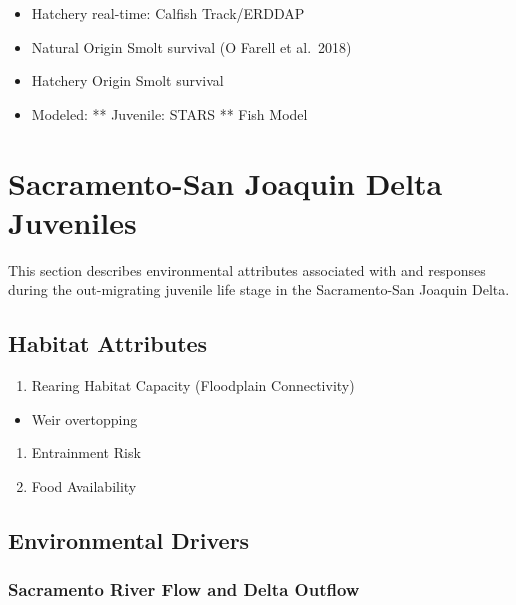 \documentclass[
]{book}
\providecommand{\tightlist}{%
  \setlength{\itemsep}{0pt}\setlength{\parskip}{0pt}}
\theoremstyle{definition}
\theoremstyle{definition}
\theoremstyle{definition}
\theoremstyle{definition}
\theoremstyle{remark}
\begin{document}
\begin{itemize}
\tightlist
\item
  Hatchery real-time: Calfish Track/ERDDAP
\item
  Natural Origin Smolt survival (O Farell et al.~2018)
\item
  Hatchery Origin Smolt survival
\item
  Modeled: ** Juvenile: STARS ** Fish Model
\end{itemize}

\hypertarget{sacramento-san-joaquin-delta-juveniles}{%
\chapter{Sacramento-San Joaquin Delta Juveniles}\label{sacramento-san-joaquin-delta-juveniles}}

This section describes environmental attributes associated with and responses during the out-migrating juvenile life stage in the Sacramento-San Joaquin Delta.

\hypertarget{habitat-attributes-4}{%
\section{Habitat Attributes}\label{habitat-attributes-4}}

\begin{enumerate}
\def\labelenumi{\arabic{enumi}.}
\tightlist
\item
  Rearing Habitat Capacity (Floodplain Connectivity)
\end{enumerate}

\begin{itemize}
\tightlist
\item
  Weir overtopping
\end{itemize}

\begin{enumerate}
\def\labelenumi{\arabic{enumi}.}
\setcounter{enumi}{1}
\item
  Entrainment Risk
\item
  Food Availability
\end{enumerate}

\hypertarget{environmental-drivers-3}{%
\section{Environmental Drivers}\label{environmental-drivers-3}}

\hypertarget{sacramento-river-flow-and-delta-outflow}{%
\subsection{Sacramento River Flow and Delta Outflow}\label{sacramento-river-flow-and-delta-outflow}}
\end{document}
